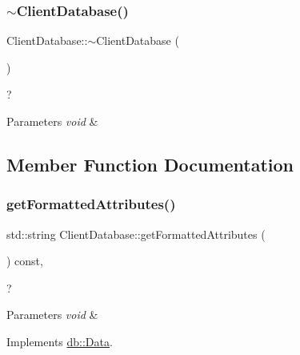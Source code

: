\subsubsection{\texorpdfstring{$\sim$\+Client\+Database()}{~ClientDatabase()}}
{\footnotesize\ttfamily Client\+Database\+::$\sim$\+Client\+Database (\begin{DoxyParamCaption}{ }\end{DoxyParamCaption})}



? 


\begin{DoxyParams}{Parameters}
{\em void} & \\
\hline
\end{DoxyParams}


\subsection{Member Function Documentation}
\mbox{\label{classdb_1_1_client_database_a930ad117ea6c1f1306f44db8716ab26a}} 
\subsubsection{\texorpdfstring{get\+Formatted\+Attributes()}{getFormattedAttributes()}}
{\footnotesize\ttfamily std\+::string Client\+Database\+::get\+Formatted\+Attributes (\begin{DoxyParamCaption}{ }\end{DoxyParamCaption}) const\hspace{0.3cm}{\ttfamily [virtual]}, {\ttfamily [noexcept]}}



? 


\begin{DoxyParams}{Parameters}
{\em void} & \\
\hline
\end{DoxyParams}


Implements \hyperlink{classdb_1_1_data}{db\+::\+Data}.

\mbox{\label{classdb_1_1_client_database_a70e9abb4361ecc6a0ea168a63743e093}} 
